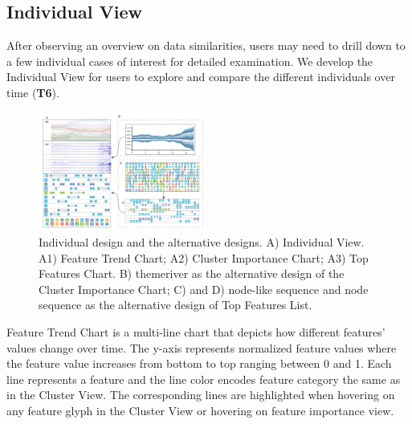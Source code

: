 \subsection{Individual View}
After observing an overview on data similarities, users may need to drill down to a few individual cases of interest for detailed examination.
We develop the Individual View for users to explore and compare the different individuals over time (\textbf{T6}).


\begin{figure}[t]
	\centering
    \includegraphics[width=0.49\textwidth]{pictures/design/alternative_design.pdf}
	\vspace{-3mm}
	\caption{Individual design and the alternative designs. A) Individual View. A1) Feature Trend Chart; A2) Cluster Importance Chart; A3) Top Features Chart. B) themeriver as the alternative design of the Cluster Importance Chart; C) and D) node-like sequence and node sequence as the alternative design of Top Features List.}
	\label{fig:individual_view}
	\vspace{-4mm}
\end{figure}


Feature Trend Chart is a multi-line chart that depicts how different features' values change over time. 
The y-axis represents normalized feature values where the feature value increases from bottom to top ranging between 0 and 1.
Each line represents a feature and the line color encodes feature category the same as in the Cluster View.
The corresponding lines are highlighted when hovering on any feature glyph in the Cluster View or hovering on feature importance view. 

